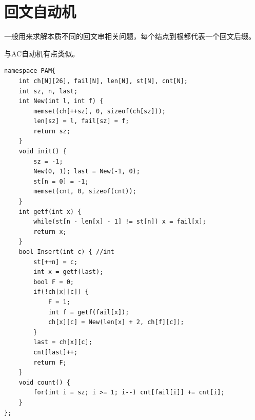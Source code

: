 \documentclass[a4paper,11pt,twoside,fontset = fandol,UTF8]{ctexbook} %
\begin{document}
	\section{回文自动机}
	一般用来求解本质不同的回文串相关问题，每个结点到根都代表一个回文后缀。
	
	与AC自动机有点类似。
	\begin{lstlisting}
namespace PAM{
    int ch[N][26], fail[N], len[N], st[N], cnt[N];
    int sz, n, last;
    int New(int l, int f) {
        memset(ch[++sz], 0, sizeof(ch[sz]));
        len[sz] = l, fail[sz] = f;
        return sz;
    }
    void init() {
        sz = -1;
        New(0, 1); last = New(-1, 0);
        st[n = 0] = -1;
        memset(cnt, 0, sizeof(cnt));
    }
    int getf(int x) {
        while(st[n - len[x] - 1] != st[n]) x = fail[x];
        return x;
    }
    bool Insert(int c) { //int
        st[++n] = c;
        int x = getf(last);
        bool F = 0;
        if(!ch[x][c]) {
            F = 1;
            int f = getf(fail[x]);
            ch[x][c] = New(len[x] + 2, ch[f][c]);
        }
        last = ch[x][c];
        cnt[last]++;
        return F;
    }
    void count() {
        for(int i = sz; i >= 1; i--) cnt[fail[i]] += cnt[i];
    }
};
	\end{lstlisting}
\end{document}
